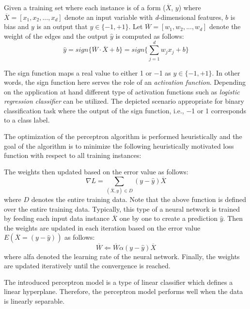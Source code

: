 Given a training set where each instance is of a form ($\overline{X}$, $y$) where $\overline{X}=[x_1,x_2,...,x_d]$ denote an input variable with \textit{d}-dimensional features, $b$ is bias and $y$ is an output that $y \in{\{-1, +1\}}$. Let $\overline{W}=[w_1,w_2,...,w_d]$ denote the weight of the edges and the output $\hat{y}$ is computed as follows: \begin{equation}
\hat{y}=sign\{ \overline{W}\cdot \overline{X}+b\} = sign\{ \sum\limits_{j=1}^{d} w_jx_j+b\}
\end{equation}


The sign function maps a real value to either \num{+1} or \num{-1} as $y \in{\{-1, +1\}}$. In other words, the sign function here serves the role of an \textit{activation function}. Depending on the application at hand different type of activation functions such as \textit{logistic regression classifier} can be utilized. The depicted scenario appropriate for binary classification task where the output of the sign function, i.e., \num{-1} or \num{+1} corresponds to a class label. 


The optimization of the perceptron algorithm is performed heuristically and the goal of the algorithm is to minimize the following heuristically motivated loss function with respect to all training instances:

The weights then updated based on the error value as follows:
\begin{equation}
    \nabla L=\sum\limits_{(\overline{X},y) \in D}(y-\hat{y})\overline{X}
\end{equation}
where $D$ denotes the entire training data. Note that the above function is defined over the entire training data. Typically, this type of a neural network is trained by feeding each input data instance $\overline{X}$ one by one to create a prediction $\hat{y}$. Then the weights are updated in each iteration based on the error value $E(\overline{X} = (y-\hat{y}))$ as follows:
\begin{equation}
    \overline{W} \Leftarrow \overline{W} \alpha (y-\hat{y})\overline{X}
\end{equation}
where alfa denoted the learning rate of the neural network. Finally, the weights are updated iteratively until the convergence is reached. 

The introduced perceptron model is a type of linear classifier which defines a linear hyperplane. Therefore, the perceptron model performs well when the data is linearly separable.
